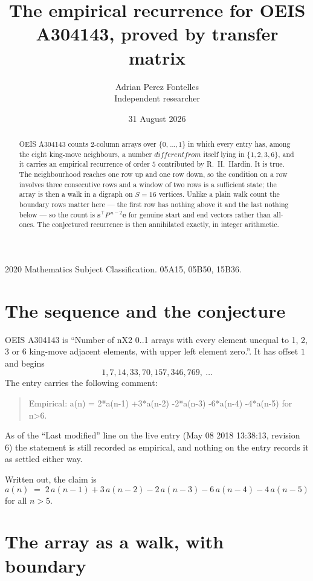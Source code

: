 \documentclass[11pt,a4paper]{article}
\title{The empirical recurrence for OEIS A304143, proved by transfer matrix}
\author{Adrian Perez Fontelles\\ \small Independent researcher}
\date{31 August 2026}
\theoremstyle{plain}
\theoremstyle{definition}
\begin{document}
\maketitle

\begin{abstract}
OEIS A304143 counts $2$-column arrays over $\{0,\dots,1\}$ in which every entry has,
among the eight king-move neighbours, a number $different from$ itself lying in $\{1,2,3,6\}$, and it carries an empirical
recurrence of order $5$ contributed by R.~H.~Hardin. It is true. The neighbourhood
reaches one row up and one row down, so the condition on a row involves three consecutive
rows and a window of two rows is a sufficient state; the array is then a walk in a digraph
on $S=16$ vertices. Unlike a plain walk count the boundary rows matter here --- the first
row has nothing above it and the last nothing below --- so the count is
$\mathbf{s}^{\!\top}P^{\,n-2}\mathbf{e}$ for genuine start and end vectors rather than
all-ones. The conjectured recurrence is then annihilated exactly, in integer arithmetic.
\end{abstract}

\noindent\small 2020 Mathematics Subject Classification. 05A15, 05B50, 15B36.\normalsize

\section{The sequence and the conjecture}

OEIS A304143 is ``Number of nX2 0..1 arrays with every element unequal to 1, 2, 3 or 6 king-move adjacent elements, with upper left element zero.''. It has offset
$1$ and begins
\[
1, 7, 14, 33, 70, 157, 346, 769,\ \dots
\]
The entry carries the following comment:
\begin{quote}\small
Empirical: a(n) = 2*a(n-1) +3*a(n-2) -2*a(n-3) -6*a(n-4) -4*a(n-5) for n>6.
\end{quote}
As of the ``Last modified'' line on the live entry (May 08 2018 13:38:13, revision
6) the statement is still recorded as empirical, and nothing on the entry
records it as settled either way.

Written out, the claim is
\begin{equation}\label{eq:conj}
a(n)\;=\;2\,a(n-1) + 3\,a(n-2) - 2\,a(n-3) - 6\,a(n-4) - 4\,a(n-5)
\end{equation}
for all $n>5$.

\section{The array as a walk, with boundary}
\end{document}
